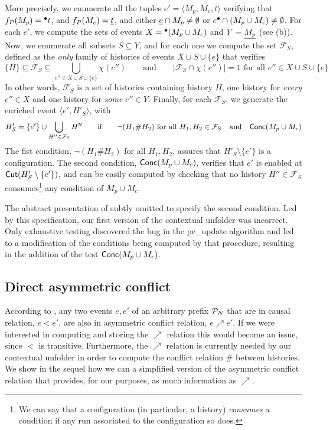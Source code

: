 \documentclass[11pt,a4paper]{article}
\newcommand{\confl}{\ensuremath{\mathord{\#}}}
\newcommand{\peupdate}{\mbox{\sf pe\_update}}
\begin{document}
More precisely, we enumerate all the tuples $e' = \langle M_p, M_c, t \rangle$
verifying that $f_P (M_p) = {}^\bullet t$, and $f_P (M_c) = \underline{t}$, and either
$\underline{e} \cap M_p \ne \emptyset$ or $e^\bullet \cap (M_p \cup M_c) \ne
\emptyset$.  For each $e'$, we compute the sets of events $X = {}^\bullet(M_p \cup
M_c)$ and $Y = \underline{M_p}$ (see  (b)).  Now, we
enumerate all subsets $S \subseteq Y$, and for each one we compute the set
$\mathcal{F}_S$, defined as the \emph{only} family of histories of events $X
\cup S \cup \{e\}$ that verifies $$ \{H\} \subseteq \mathcal{F}_S \subseteq
\bigcup_{e'' \in X \cup S \cup \{e\}} \chi (e'') \qquad \mbox{and} \qquad
|\mathcal{F}_S \cap \chi(e'')| = 1 \mbox{ for all } e'' \in X \cup S \cup
\{e\}$$  In other words, $\mathcal{F}_S$ is a set of histories containing
history $H$, one history for \emph{every} $e'' \in X$ and one history for
\emph{some} $e'' \in Y$.  Finally, for each $\mathcal{F}_S$, we generate the
enriched event $\langle e', H'_S \rangle$, with $$H'_S = \{e'\} \cup
\bigcup_{H'' \in \mathcal{F}_S} H'' \qquad \mbox{if} \qquad \lnot (H_1 \confl
H_2) \mbox{ for all } H_1, H_2 \in \mathcal{F}_S \quad \mbox{and} \quad
\conc{M_p \cup M_c}$$  The fist condition, $\lnot (H_1 \confl H_2)$ for all
$H_1, H_2$, assures that $H'_S \setminus \{e'\}$ is a configuration.  The
second condition, $\mathsf{Conc }{(M_p \cup M_c)}$, verifies that $e'$ is enabled at
$\mathsf{Cut }{(H'_S \setminus \{e'\})}$, and can be easily computed by checking that no
history $H'' \in \mathcal{F}_S$ consumes\footnote{We can say that a
configuration (in particular, a history) \emph{consumes} a condition if any run
associated to the configuration so does.} any condition of $M_p \cup M_c$.

The abstract presentation of  subtly omitted to specify the
second condition.  Led by this specification, our first version of the
contextual unfolder was incorrect.  Only exhaustive testing discovered the bug
in the \peupdate{} algorithm and led to a modification of the conditions being
computed by that procedure, resulting in the addition of the test $\mathsf{Conc }{(M_p
\cup M_c)}$.  


\subsection{Direct asymmetric conflict}

According to , any two events $e, e'$ of an arbitrary
prefix $\mathcal{P}_{N}$ that are in causal relation, $e < e'$, are also in asymmetric
conflict relation, $e \nearrow e'$.  If we were interested in computing and
storing the $\nearrow$ relation this would become an issue, since $<$ is
transitive.  Furthermore, the $\nearrow$ relation is currently needed by our
contextual unfolder in order to compute the conflict relation $\confl$ between
histories.  We show in the sequel how we can  a
simplified version of the asymmetric conflict relation that provides, for our
purposes, as much information as $\nearrow$.
\end{document}
